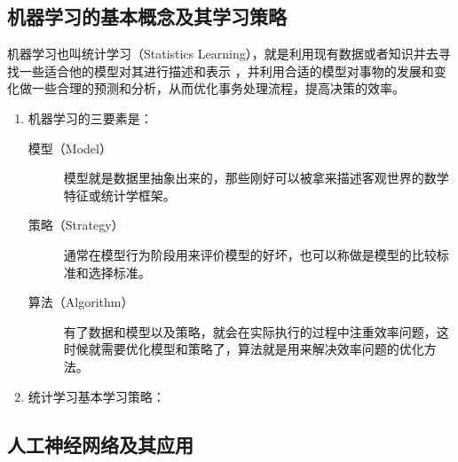 \documentclass[12pt,a4paper,UTF8]{ctexart}
\begin{document}
\subsection{机器学习的基本概念及其学习策略}
机器学习也叫统计学习（Statistics Learning），就是利用现有数据或者知识并去寻找一些适合他的模型对其进行描述和表示
，并利用合适的模型对事物的发展和变化做一些合理的预测和分析，从而优化事务处理流程，提高决策的效率。
\begin{enumerate}
    \item 机器学习的三要素是：
    \begin{description}
        \item[模型（Model）] 模型就是数据里抽象出来的，那些刚好可以被拿来描述客观世界的数学特征或统计学框架。
        \item[策略（Strategy）] 通常在模型行为阶段用来评价模型的好坏，也可以称做是模型的比较标准和选择标准。
        \item[算法（Algorithm）] 有了数据和模型以及策略，就会在实际执行的过程中注重效率问题，这时候就需要优化模型和策略了，算法就是用来解决效率问题的优化方法。
    \end{description}
    \item 统计学习基本学习策略：
\end{enumerate}
\subsection{人工神经网络及其应用}
\end{document}
